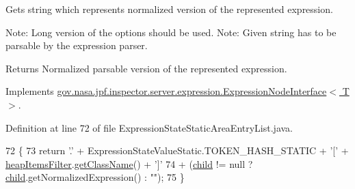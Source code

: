 Gets string which represents normalized version of the represented expression. 

Note\+: Long version of the options should be used. Note\+: Given string has to be parsable by the expression parser.

\begin{DoxyReturn}{Returns}
Normalized parsable version of the represented expression. 
\end{DoxyReturn}


Implements \hyperlink{interfacegov_1_1nasa_1_1jpf_1_1inspector_1_1server_1_1expression_1_1_expression_node_interface_ae5387d8da0126c1256a786d54b9bd7ce}{gov.\+nasa.\+jpf.\+inspector.\+server.\+expression.\+Expression\+Node\+Interface$<$ T $>$}.



Definition at line 72 of file Expression\+State\+Static\+Area\+Entry\+List.\+java.


\begin{DoxyCode}
72                                            \{
73     \textcolor{keywordflow}{return} \textcolor{charliteral}{'.'} + ExpressionStateValueStatic.TOKEN\_HASH\_STATIC + \textcolor{charliteral}{'['} + 
      \hyperlink{classgov_1_1nasa_1_1jpf_1_1inspector_1_1server_1_1expression_1_1expressions_1_1_expression_state_static_area_entry_list_a9c9eb1befb339add68a81b78db3a8703}{heapItemsFilter}.\hyperlink{classgov_1_1nasa_1_1jpf_1_1inspector_1_1utils_1_1expressions_1_1_class_name_a4953615ac3b331dac220f0ab4a817095}{getClassName}() + \textcolor{charliteral}{']'}
74         + (\hyperlink{classgov_1_1nasa_1_1jpf_1_1inspector_1_1server_1_1expression_1_1_expression_state_unary_operator_a66041b1f569a361549e28a00f7ca5f2f}{child} != null ? \hyperlink{classgov_1_1nasa_1_1jpf_1_1inspector_1_1server_1_1expression_1_1_expression_state_unary_operator_a66041b1f569a361549e28a00f7ca5f2f}{child}.getNormalizedExpression() : \textcolor{stringliteral}{""});
75   \}
\end{DoxyCode}
